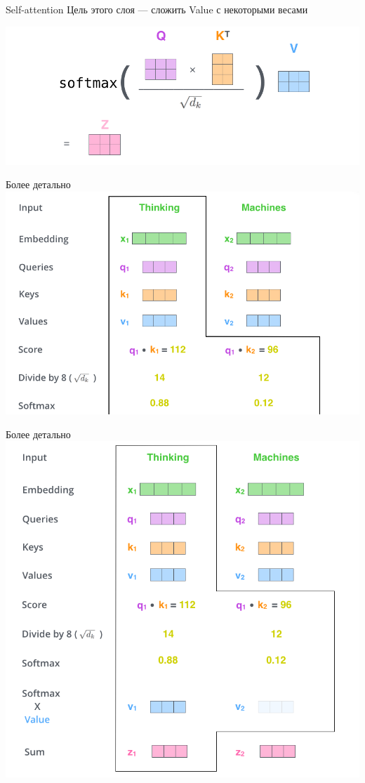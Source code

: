 \documentclass[notes,12pt, aspectratio=169]{beamer}
\begin{document}
\begin{frame}{Self-attention} 
Цель этого слоя — сложить Value с некоторыми весами

\begin{center}
	\includegraphics[width=.9\linewidth]{self_final.png}
\end{center}
\end{frame}


\begin{frame}{Более детально}
\centering
\includegraphics[width=0.8\linewidth]{step_3}
\end{frame}


\begin{frame}{Более детально}
\centering
\includegraphics[width=0.5\linewidth]{step_4}
\end{frame}
\end{document}
